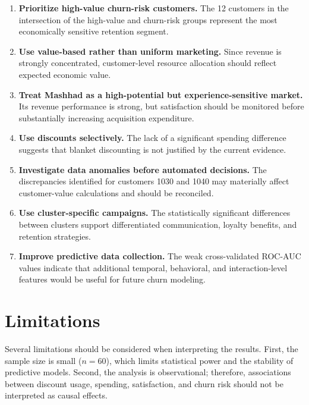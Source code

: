 \documentclass[11pt,a4paper]{article}
\begin{document}
\begin{enumerate}
    \item \textbf{Prioritize high-value churn-risk customers.}
    The 12 customers in the intersection of the high-value and churn-risk
    groups represent the most economically sensitive retention segment.

    \item \textbf{Use value-based rather than uniform marketing.}
    Since revenue is strongly concentrated, customer-level resource
    allocation should reflect expected economic value.

    \item \textbf{Treat Mashhad as a high-potential but experience-sensitive
    market.} Its revenue performance is strong, but satisfaction should
    be monitored before substantially increasing acquisition expenditure.

    \item \textbf{Use discounts selectively.}
    The lack of a significant spending difference suggests that blanket
    discounting is not justified by the current evidence.

    \item \textbf{Investigate data anomalies before automated decisions.}
    The discrepancies identified for customers 1030 and 1040 may materially
    affect customer-value calculations and should be reconciled.

    \item \textbf{Use cluster-specific campaigns.}
    The statistically significant differences between clusters support
    differentiated communication, loyalty benefits, and retention
    strategies.

    \item \textbf{Improve predictive data collection.}
    The weak cross-validated ROC-AUC values indicate that additional
    temporal, behavioral, and interaction-level features would be useful
    for future churn modeling.
\end{enumerate}

\section{Limitations}

Several limitations should be considered when interpreting the results.
First, the sample size is small ($n=60$), which limits statistical power
and the stability of predictive models. Second, the analysis is
observational; therefore, associations between discount usage, spending,
satisfaction, and churn risk should not be interpreted as causal effects.
\end{document}
